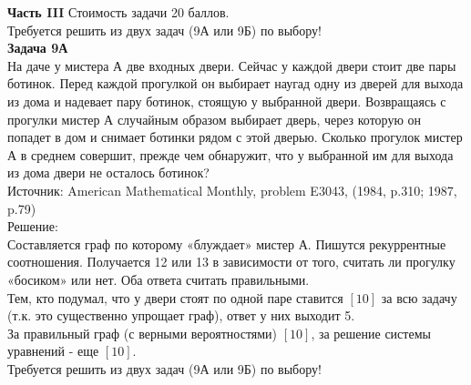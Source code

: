 \documentclass[12pt, a4paper]{article}\usepackage[]{graphicx}\usepackage[]{color}
\begin{document}
\textbf{Часть III} Стоимость задачи 20 баллов. \\

Требуется решить \textbf{} из двух задач (9А или 9Б) по
выбору! \\

\textbf{Задача 9А} \\
На даче у мистера А две входных двери. Сейчас у каждой двери стоит две пары ботинок. Перед каждой прогулкой он выбирает наугад одну из дверей для выхода из дома и надевает пару ботинок, стоящую у выбранной двери. Возвращаясь с прогулки мистер А случайным образом выбирает дверь, через которую он попадет в дом и снимает ботинки рядом с этой дверью. Сколько прогулок мистер А в среднем совершит, прежде чем обнаружит, что у выбранной им для выхода из дома двери не осталось ботинок? \\
Источник: American Mathematical Monthly, problem E3043, (1984, p.310; 1987, p.79)\\
Решение: \\
Составляется граф по которому «блуждает» мистер А. Пишутся рекуррентные соотношения.
Получается 12 или 13 в зависимости от того, считать ли прогулку «босиком» или нет.
Оба ответа считать правильными.\\
Тем, кто подумал, что у двери стоят по одной паре ставится $[10]$ за всю задачу (т.к. это существенно упрощает граф), ответ у них выходит 5. \\
За правильный граф (с верными вероятностями) $[10]$, за решение системы уравнений - еще $[10]$. \\




Требуется решить \textbf{} из двух задач (9А или 9Б) по
выбору! \\
\end{document}
